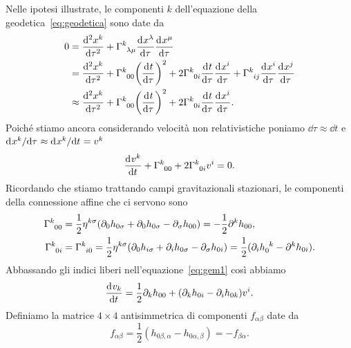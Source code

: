 Nelle ipotesi illustrate, le componenti $k$ dell'equazione della
geodetica~\eqref{eq:geodetica} sono date da
\begin{equation}
    \begin{split}
    0 &= \toder[2]{x^{k}}{\tau} + \tensor{\Gamma}{^{k}_{\lambda\mu}}
    \toder{x^{\lambda}}{\tau} \toder{x^{\mu}}{\tau} \\
    &= \toder[2]{x^{k}}{\tau} + \tensor{\Gamma}{^{k}_{00}} \bigg(
    \toder{t}{\tau} \bigg)^{2} + 2\tensor{\Gamma}{^{k}_{0i}}\toder{t}{\tau}
    \toder{x^{i}}{\tau} + \tensor{\Gamma}{^{k}_{ij}} \toder{x^{i}}{\tau}
    \toder{x^{j}}{\tau} \\
    &\approx \toder[2]{x^{k}}{\tau} + \tensor{\Gamma}{^{k}_{00}}\bigg(
    \toder{t}{\tau} \bigg)^{2} + 2\tensor{\Gamma}{^{k}_{0i}}\toder{t}{\tau}
    \toder{x^{i}}{\tau}.
  \end{split}
\end{equation}
Poiché stiamo ancora considerando velocità non relativistiche poniamo
$\dd \tau \approx \dd t$ e
$\mathrm{d}^{}x^{k} / \mathrm{d} {\tau}^{} \approx \mathrm{d}^{}x^{k} / \mathrm{d} {t}^{} = v^{k}$
\begin{equation}
  \label{eq:gem1}
  \toder{v^{k}}{t} + \tensor{\Gamma}{^{k}_{00}} +
  2\tensor{\Gamma}{^{k}_{0i}}v^{i} = 0.
\end{equation}
Ricordando che stiamo trattando campi gravitazionali stazionari, le componenti
della connessione affine che ci servono sono
\begin{subequations}
  \begin{align}
    \tensor{\Gamma}{^{k}_{00}} &=
    \frac{1}{2}\eta^{k\sigma}(\partial_{0}h_{0\sigma} + \partial_{0}h_{0\sigma}
    - \partial_{\sigma}h_{00}) = - \frac{1}{2}\partial^{k}h_{00}, \\
    \tensor{\Gamma}{^{k}_{0i}} &= \tensor{\Gamma}{^{k}_{i0}} =
    \frac{1}{2}\eta^{k\sigma} (\partial_{0}h_{i\sigma} + \partial_{i}h_{0\sigma}
    - \partial_{\sigma}h_{0i}) = \frac{1}{2}(\partial_{i}\tensor{h}{_{0}^{k}}
    - \partial^{k}h_{0i}).
  \end{align}
\end{subequations}
Abbassando gli indici liberi nell'equazione~\eqref{eq:gem1} così abbiamo
\begin{equation}
  \label{eq:gem2}
  \frac{{\mathop{}\!\mathrm{d}^{}}v_{k}}{\mathop{}\!\mathrm{d} {t}^{}} = \frac{1}{2}\partial_{k}h_{00} + (\partial_{k}h_{0i}
  - \partial_{i}h_{0k})v^{i}.
\end{equation}
Definiamo la matrice $4 \times 4$ antisimmetrica di componenti $f_{\alpha\beta}$
date da
\begin{equation}
  f_{\alpha\beta} = \frac{1}{2}(h_{0\beta,\alpha} - h_{0\alpha,\beta}) =
  -f_{\beta\alpha}.
\end{equation}
